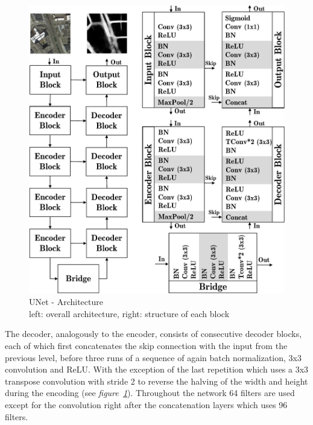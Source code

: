 \documentclass[10pt,conference,compsocconf]{IEEEtran}
\begin{document}
\begin{figure}[ht]
\centering
    \includegraphics[width=0.85\columnwidth]{images/unet.pdf}
    \captionsetup{justification=centering}
    \caption{UNet - Architecture\\
    left: overall architecture, right: structure of each block}
    \label{fig:unet-arch}
\end{figure}

The decoder, analogously to the encoder, consists of consecutive decoder blocks, each of which first concatenates the skip connection with the input from the previous level, before three runs of a sequence of again batch normalization, 3x3 convolution and ReLU. With the exception of the last repetition which uses a 3x3 transpose convolution with stride 2 to reverse the halving of the width and height during the encoding (see \textit{figure~\ref{fig:unet-arch}}). Throughout the network 64 filters are used except for the convolution right after the concatenation layers which uses 96 filters.
\end{document}
